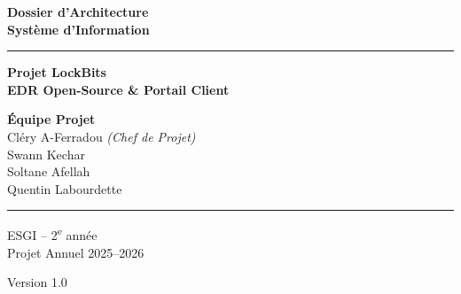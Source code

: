 




\begin{titlepage}
  \centering

  \vspace*{2cm}

  {\Huge\bfseries\color{primaryblue} Dossier d'Architecture\\[0.3em]
                              Système d'Information}

  \vspace{1cm}

  \rule{\textwidth}{1pt}

  \vspace{1cm}

  {\LARGE\bfseries Projet LockBits\\[0.4em]
   \large EDR Open-Source \& Portail Client}

  \vspace{2cm}

  \begin{minipage}{0.6\textwidth}
    \centering
    \large
    \textbf{Équipe Projet}\\[0.5em]
    Cléry A-Ferradou \textit{(Chef de Projet)}\\[0.3em]
    Swann Kechar\\[0.3em]
    Soltane Afellah\\[0.3em]
    Quentin Labourdette
  \end{minipage}

  \vfill

  \rule{\textwidth}{1pt}

  \vspace{0.5cm}

  {\large ESGI -- 2\textsuperscript{e} année\\[0.2em]
   Projet Annuel 2025--2026}

  \vspace{0.3cm}

  {\large Version 1.0}

\end{titlepage}

